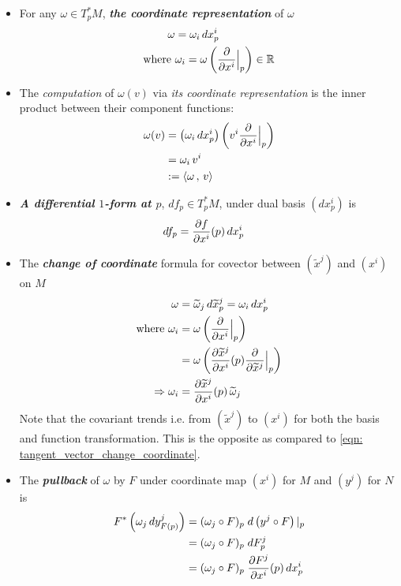 \documentclass[11pt]{article}
\begin{document}
\begin{itemize}
\item For any $\omega \in T_p^{*}M$, \emph{\textbf{the coordinate representation}} of $\omega$
\begin{align}
\omega &= \omega_i \, dx_p^{i} \label{eqn: covector_coordinate}\\
\text{where }& \omega_i = \omega\left(\frac{\partial }{ \partial x^{i}}\Bigr|_{p}\right) \in {\mathbb R} \label{eqn: covector_coordinate_component}
\end{align}

\item The \emph{computation} of $\omega(v)$ via \emph{its coordinate representation} is the inner product between their component functions:
\begin{align}
\omega(v) &= \left(\omega_i \, dx_p^{i}\right)\left(v^i \frac{\partial }{ \partial x^i}\Bigr|_{p}\right) \nonumber\\
&= \omega_i\,v^i  \label{eqn: covector_act_on_vector_coordinate}\\
&:= \left\langle \omega\,,\, v \right\rangle  \nonumber
\end{align}

\item \emph{\textbf{A differential $1$-form at $p$}}, $df_p \in T_p^{*}M$, under dual basis $(dx_p^i)$ is
\begin{align}
df_{p} &= \frac{\partial f}{ \partial x^i}(p)\, dx_p^i  \label{eqn: differential_1_form_at_p}
\end{align}

\item The \emph{\textbf{change of coordinate}} formula for covector between $(\widetilde{x}^{j})$ and $(x^i)$ on $M$
\begin{align}
\omega &= \widetilde{\omega}_j\,d\widetilde{x}_p^{j} = \omega_i\,dx_p^i \nonumber\\
\text{where } \omega_i&= \omega\left(\frac{\partial }{ \partial x^i}\Bigr|_{p}\right)\nonumber\\
&= \omega\left(\frac{\partial \widetilde{x}^{j}}{ \partial x^i}(p)\frac{\partial }{ \partial \widetilde{x}^j}\Bigr|_{p}\right) \nonumber\\
\Rightarrow \omega_i &= \frac{\partial \widetilde{x}^j}{ \partial x^i}(p)\,\widetilde{\omega}_j \label{eqn: covector_change_of_coordinate}
\end{align} Note that the covariant trends i.e. from $(\widetilde{x}^{j})$ to $(x^i)$ for both the basis and function transformation. This is the opposite as compared to \eqref{eqn: tangent_vector_change_coordinate}.

\item The \emph{\textbf{pullback}} of $\omega$ by $F$ under coordinate map $(x^i)$ for $M$ and $(y^j)$ for $N$ is 
\begin{align}
F^{*}\left(\omega_j\, dy_{F(p)}^{j}\right)&= (\omega_j \circ F)_{p}\;d\left(y^{j} \circ F\right)|_{p} \label{eqn: pullback_coordinate_1}\\
&= (\omega_j \circ F)_{p}\;dF_{p}^{j} \label{eqn: pullback_coordinate_2}\\
&=(\omega_j \circ F)_{p}\;  \frac{\partial F^{j}}{ \partial x^{i}}(p) \,dx_{p}^{i}\label{eqn: pullback_coordinate_3}
\end{align}


\end{itemize}
\end{document}
